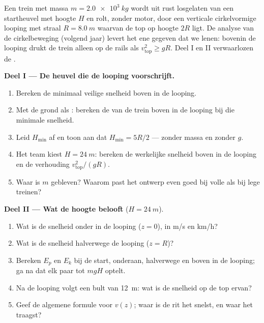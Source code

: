 \begin{problem}
\label{pb:g11:mechanical-energy:1}
Een trein met massa $m = \qty{2.0e3}{kg}$ wordt uit rust losgelaten van
een startheuvel met hoogte $H$ en rolt, zonder motor, door een verticale
cirkelvormige looping met straal $R = \qty{8.0}{m}$ waarvan de top op
hoogte $2R$ ligt. De analyse van de cirkelbeweging (volgend jaar) levert
het ene gegeven dat we lenen: bovenin de looping drukt de trein alleen op
de rails als $v_{\text{top}}^2 \geq gR$. Deel I en II verwaarlozen de
.

\medskip
\noindent\textbf{Deel I --- De heuvel die de looping voorschrijft.}
\begin{enumerate}
  \item Bereken de minimaal veilige snelheid boven in de looping.
  \item Met de grond als : bereken de 
        van de trein boven in de looping bij die minimale snelheid.
  \item Leid $H_{\min}$ af en toon aan dat $H_{\min} = 5R/2$ --- zonder
        massa en zonder $g$.
  \item Het team kiest $H = \qty{24}{m}$: bereken de werkelijke snelheid
        boven in de looping en de verhouding $v_{\text{top}}^2/(gR)$.
  \item Waar is $m$ gebleven? Waarom past het ontwerp even goed bij volle
        als bij lege treinen?
\end{enumerate}

\medskip
\noindent\textbf{Deel II --- Wat de hoogte belooft} ($H = \qty{24}{m}$).
\begin{enumerate}[resume]
  \item Wat is de snelheid onder in de looping ($z = 0$), in \unit{m/s} en
        \unit{km/h}?
  \item Wat is de snelheid halverwege de looping ($z = R$)?
  \item Bereken $E_p$ en $E_k$ bij de start, onderaan, halverwege en
        boven in de looping; ga na dat elk paar tot $mgH$ optelt.
  \item Na de looping volgt een bult van \qty{12}{m}: wat is de snelheid
        op de top ervan?
  \item Geef de algemene formule voor $v(z)$; waar is de rit het snelst,
        en waar het traagst?
\end{enumerate}


\end{problem}
